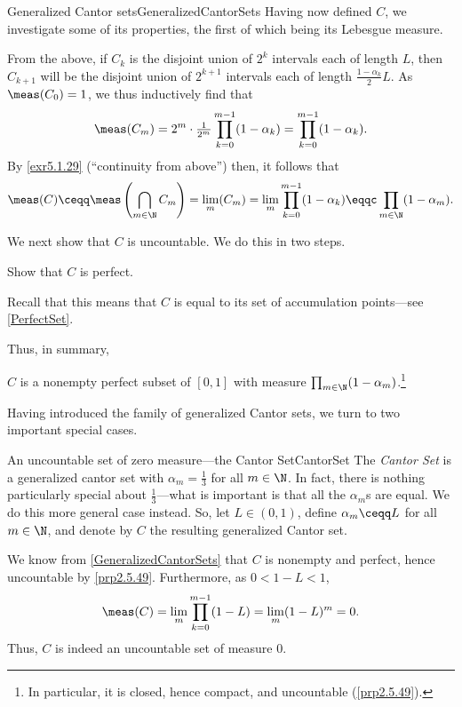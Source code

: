 \begin{exm}{Generalized Cantor sets}{GeneralizedCantorSets}
Having now defined $C$, we investigate some of its properties, the first of which being its Lebesgue measure.

From the above, if $C_k$ is the disjoint union of $2^k$ intervals each of length $L$, then $C_{k+1}$ will be the disjoint union of $2^{k+1}$ intervals each of length $\frac{1-\alpha _k}{2}L$.  As $\meas (C_0)=1$, we thus inductively find that
\begin{equation}
\meas (C_m)=2^m\cdot \tfrac{1}{2^m}\prod _{k=0}^{m-1}(1-\alpha _k)=\prod _{k=0}^{m-1}(1-\alpha _k).
\end{equation}
By \cref{exr5.1.29} (``continuity from above'') then, it follows that
\begin{equation}
\meas (C)\ceqq \meas \left( \bigcap _{m\in \N}C_m\right) =\lim _m(C_m)=\lim _m\prod _{k=0}^{m-1}(1-\alpha _k)\eqqc \prod _{m\in \N}(1-\alpha _m).
\end{equation}

We next show that $C$ is uncountable.  We do this in two steps.
\begin{exr}[breakable=false]{}{}
Show that $C$ is perfect.
\begin{rmk}
Recall that this means that $C$ is equal to its set of accumulation points---see \cref{PerfectSet}.
\end{rmk}
\end{exr}

Thus, in summary,
\begin{displayquote}
$C$ is a nonempty perfect subset of $[0,1]$ with measure $\prod _{m\in \N}(1-\alpha _m)$.\footnote{In particular, it is closed, hence compact, and uncountable (\cref{prp2.5.49}).}
\end{displayquote}
\end{exm}
Having introduced the family of generalized Cantor sets, we turn to two important special cases.
\begin{exm}{An uncountable set of zero measure---the Cantor Set}{CantorSet}
The \emph{Cantor Set} is a generalized cantor set with $\alpha _m=\frac{1}{3}$ for all $m\in \N$.  In fact, there is nothing particularly special about $\frac{1}{3}$---what is important is that all the $\alpha _m$s are equal.  We do this more general case instead.  So, let $L\in (0,1)$, define $\alpha _m\ceqq L$ for all $m\in \N$, and denote by $C$ the resulting generalized Cantor set.

We know from \cref{GeneralizedCantorSets} that $C$ is nonempty and perfect, hence uncountable by \cref{prp2.5.49}.  Furthermore, as $0<1-L<1$,
\begin{equation}
\meas (C)=\lim _m\prod _{k=0}^{m-1}(1-L)=\lim _m(1-L)^m=0.
\end{equation} 
Thus, $C$ is indeed an uncountable set of measure $0$.
\end{exm}
